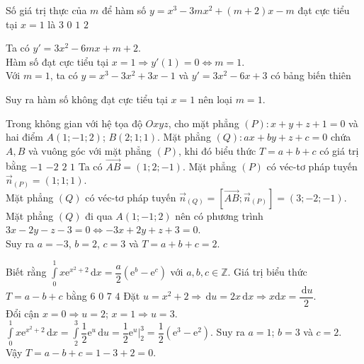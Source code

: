\begin{ex}%
Số giá trị thực của $m$ để hàm số $y=x^3-3m x^2+(m+2) x-m$ đạt cực tiểu tại $x=1$ là
\choice
{$3$}
{\True $0$}
{$1$}
{$2$}
\loigiai
{
Ta có $y'=3x^2-6mx+m+2$.\\
Hàm số đạt cực tiểu tại $x=1\Rightarrow y'(1)=0\Leftrightarrow m=1$.\\
Với $m=1$, ta có $y=x^3-3x^2+3x-1$ và $y'=3x^2-6x+3$ có bảng biến thiên
\begin{center}
\end{center}
Suy ra hàm số không đạt cực tiểu tại $x=1$ nên loại $m=1$.
}
\end{ex}

\begin{ex}%
Trong không gian với hệ tọa độ $O x y z$, cho mặt phẳng $(P)\colon x+y+z+1=0$ và hai điểm $A(1;-1;2)$; $B(2;1;1)$. Mặt phẳng $(Q)\colon a x+b y+z+c=0$ chứa $A,B$ và vuông góc với mặt phẳng $(P)$, khi đó biểu thức $T=a+b+c$ có giá trị bằng
\choice
{$-1$}
{$-2$}
{\True $2$}
{$1$}
\loigiai
{
Ta có $\overrightarrow{AB}=(1;2;-1)$. Mặt phẳng $(P)$ có véc-tơ pháp tuyến $\overrightarrow{n}_{(P)}=(1;1;1)$.\\
Mặt phẳng $(Q)$ có véc-tơ pháp tuyến $\overrightarrow{n}_{(Q)}=\left[\overrightarrow{AB};\overrightarrow{n}_{(P)}\right]=(3;-2;-1)$.\\
Mặt phẳng $(Q)$ đi qua $A(1;-1;2)$ nên có phương trình $3x-2y-z-3=0\Leftrightarrow -3x+2y+z+3=0$.\\
Suy ra $a=-3$, $b=2$, $c=3$ và $T=a+b+c=2$.
}
\end{ex}
\begin{ex}%
Biết rằng $\displaystyle\int\limits_0^1x\mathrm{e}^{x^2+2}\mathrm{\, d}x=\dfrac{a}{2}\left(\mathrm{e}^b-\mathrm{e}^c\right)$ với $a,b,c\in\mathbb{Z}$. Giá trị biểu thức $T=a-b+c$ bằng
\choice
{$6$}
{\True $0$}
{$7$}
{$4$}
\loigiai
{
Đặt $u=x^2+2\Rightarrow \mathrm{\,d}u=2x\mathrm{\,d}x\Rightarrow x\mathrm{d}x=\dfrac{\mathrm{\,d}u}{2}$.\\
Đổi cận $x=0\Rightarrow u=2$; $x=1\Rightarrow u=3$.\\
$\displaystyle\int\limits_0^1x\mathrm{e}^{x^2+2}\mathrm{\, d}x=\displaystyle\int\limits_2^3 \dfrac{1}{2}\mathrm{e}^u\mathrm{\,d}u=\dfrac{1}{2}\mathrm{e}^u\bigg|_2^3=\dfrac{1}{2}(\mathrm{e}^3-\mathrm{e}^2)$. Suy ra $a=1$; $b=3$ và $c=2$.\\
Vậy $T=a-b+c=1-3+2=0$.
}
\end{ex}

